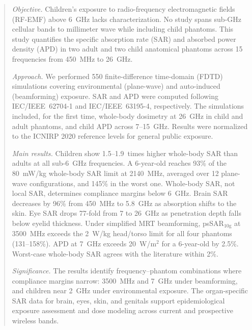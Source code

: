 \documentclass{iopjournal}
\begin{document}



\begin{abstract}
\justifying
\textit{Objective.}
Children's exposure to radio-frequency electromagnetic fields (RF-EMF) above 6~GHz lacks characterization.
No study spans sub-GHz cellular bands to millimeter wave while including child phantoms.
This study quantifies the specific absorption rate (SAR) and absorbed power density (APD) in two adult and two child anatomical phantoms across 15 frequencies from 450~MHz to 26~GHz.

\textit{Approach.}
We performed 550 finite-difference time-domain (FDTD) simulations covering environmental (plane-wave) and auto-induced (beamforming) exposure.
SAR and APD were computed following IEC/IEEE~62704-1 and IEC/IEEE~63195-4, respectively.
The simulations included, for the first time, whole-body dosimetry at 26~GHz in child and adult phantoms, and child APD across 7--15~GHz.
Results were normalized to the ICNIRP 2020 reference levels for general public exposure.

\textit{Main results.}
Children show 1.5--1.9~times higher whole-body SAR than adults at all sub-6~GHz frequencies.
A 6-year-old reaches 93\% of the 80~mW/kg whole-body SAR limit at 2140~MHz, averaged over 12 plane-wave configurations, and 145\% in the worst one.
Whole-body SAR, not local SAR, determines compliance margins below 6~GHz.
Brain SAR decreases by 96\% from 450~MHz to 5.8~GHz as absorption shifts to the skin.
Eye SAR drops 77-fold from 7 to 26~GHz as penetration depth falls below eyelid thickness.
Under simplified MRT beamforming, psSAR$_{10\mathrm{g}}$ at 3500~MHz exceeds the 2~W/kg head/torso limit for all four phantoms (131--158\%).
APD at 7~GHz exceeds 20~W/m$^2$ for a 6-year-old by 2.5\%.
Worst-case whole-body SAR agrees with the literature within 2\%.

\textit{Significance.}
The results identify frequency--phantom combinations where compliance margins narrow: 3500~MHz and 7~GHz under beamforming, and children near 2~GHz under environmental exposure.
The organ-specific SAR data for brain, eyes, skin, and genitals support epidemiological exposure assessment and dose modeling across current and prospective wireless bands.
\end{abstract}
\end{document}
